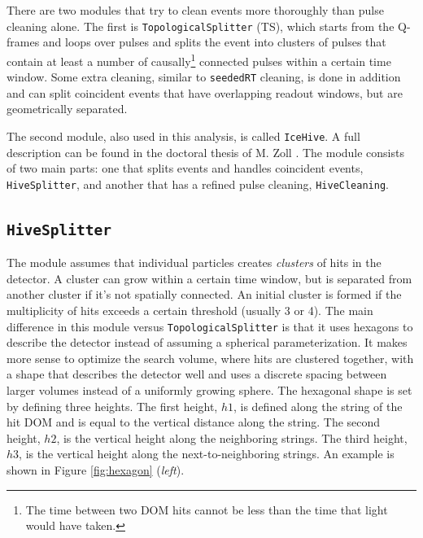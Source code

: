 \noindent There are two modules that try to clean events more thoroughly than pulse cleaning alone. The first is \texttt{TopologicalSplitter} (TS), which starts from the Q-frames and loops over pulses and splits the event into clusters of pulses that contain at least a number of causally\footnote{The time between two DOM hits cannot be less than the time that light would have taken.} connected pulses within a certain time window. Some extra cleaning, similar to \texttt{seededRT} cleaning, is done in addition and can split coincident events that have overlapping readout windows, but are geometrically separated.

The second module, also used in this analysis, is called \texttt{IceHive}. A full description can be found in the doctoral thesis of M. Zoll \cite{mzollthesis}. The module consists of two main parts: one that splits events and handles coincident events, \texttt{HiveSplitter}, and another that has a refined pulse cleaning, \texttt{HiveCleaning}.

\subsection{\texttt{HiveSplitter}}
The module assumes that individual particles creates \textit{clusters} of hits in the detector. A cluster can grow within a certain time window, but is separated from another cluster if it's not spatially connected. An initial cluster is formed if the multiplicity of hits exceeds a certain threshold (usually 3 or 4). The main difference in this module versus \texttt{TopologicalSplitter} is that it uses hexagons to describe the detector instead of assuming a spherical parameterization. It makes more sense to optimize the search volume, where hits are clustered together, with a shape that describes the detector well and uses a discrete spacing between larger volumes instead of a uniformly growing sphere. The hexagonal shape is set by defining three heights. The first height, $h1$, is defined along the string of the hit DOM and is equal to the vertical distance along the string. The second height, $h2$, is the vertical height along the neighboring strings. The third height, $h3$, is the vertical height along the next-to-neighboring strings. An example is shown in Figure \ref{fig:hexagon} (\textit{left}).

